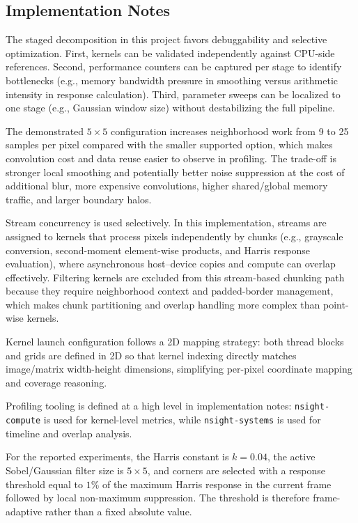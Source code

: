\documentclass[conference]{IEEEtran}
\begin{document}
\subsection{Implementation Notes}
The staged decomposition in this project favors debuggability and selective optimization. First, kernels can be validated independently against CPU-side references. Second, performance counters can be captured per stage to identify bottlenecks (e.g., memory bandwidth pressure in smoothing versus arithmetic intensity in response calculation). Third, parameter sweeps can be localized to one stage (e.g., Gaussian window size) without destabilizing the full pipeline.

The demonstrated $5\times5$ configuration increases neighborhood work from 9 to 25 samples per pixel compared with the smaller supported option, which makes convolution cost and data reuse easier to observe in profiling. The trade-off is stronger local smoothing and potentially better noise suppression at the cost of additional blur, more expensive convolutions, higher shared/global memory traffic, and larger boundary halos.

Stream concurrency is used selectively. In this implementation, streams are assigned to kernels that process pixels independently by chunks (e.g., grayscale conversion, second-moment element-wise products, and Harris response evaluation), where asynchronous host--device copies and compute can overlap effectively. Filtering kernels are excluded from this stream-based chunking path because they require neighborhood context and padded-border management, which makes chunk partitioning and overlap handling more complex than point-wise kernels.

Kernel launch configuration follows a 2D mapping strategy: both thread blocks and grids are defined in 2D so that kernel indexing directly matches image/matrix width-height dimensions, simplifying per-pixel coordinate mapping and coverage reasoning.

Profiling tooling is defined at a high level in implementation notes: \texttt{nsight-compute} is used for kernel-level metrics, while \texttt{nsight-systems} is used for timeline and overlap analysis.

For the reported experiments, the Harris constant is $k=0.04$, the active Sobel/Gaussian filter size is $5\times5$, and corners are selected with a response threshold equal to $1\%$ of the maximum Harris response in the current frame followed by local non-maximum suppression. The threshold is therefore frame-adaptive rather than a fixed absolute value.
\end{document}
